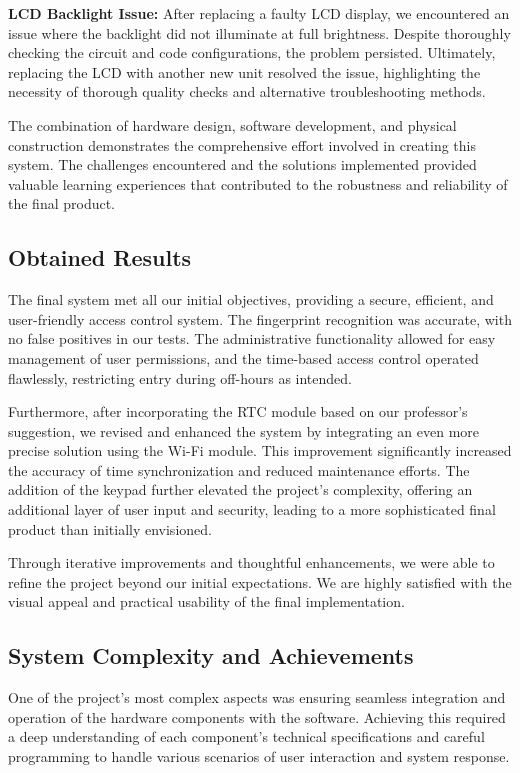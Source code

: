 \documentclass{article}
\begin{document}
\textbf{LCD Backlight Issue:} After replacing a faulty LCD display, we encountered an issue where the backlight did not illuminate at full brightness. Despite thoroughly checking the circuit and code configurations, the problem persisted. Ultimately, replacing the LCD with another new unit resolved the issue, highlighting the necessity of thorough quality checks and alternative troubleshooting methods.

The combination of hardware design, software development, and physical construction demonstrates the comprehensive effort involved in creating this system. The challenges encountered and the solutions implemented provided valuable learning experiences that contributed to the robustness and reliability of the final product.

\subsection{Obtained Results}

The final system met all our initial objectives, providing a secure, efficient, and user-friendly access control system. The fingerprint recognition was accurate, with no false positives in our tests. The administrative functionality allowed for easy management of user permissions, and the time-based access control operated flawlessly, restricting entry during off-hours as intended.

Furthermore, after incorporating the RTC module based on our professor's suggestion, we revised and enhanced the system by integrating an even more precise solution using the Wi-Fi module. This improvement significantly increased the accuracy of time synchronization and reduced maintenance efforts. The addition of the keypad further elevated the project's complexity, offering an additional layer of user input and security, leading to a more sophisticated final product than initially envisioned.

Through iterative improvements and thoughtful enhancements, we were able to refine the project beyond our initial expectations. We are highly satisfied with the visual appeal and practical usability of the final implementation.



\subsection{System Complexity and Achievements}
One of the project's most complex aspects was ensuring seamless integration and operation of the hardware components with the software. Achieving this required a deep understanding of each component's technical specifications and careful programming to handle various scenarios of user interaction and system response.
\end{document}
